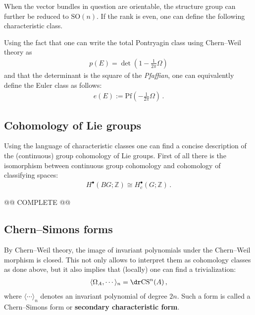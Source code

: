     When the vector bundles in question are orientable, the structure group can further be reduced to $\mathrm{SO}(n)$. If the rank is even, one can define the following characteristic class.
    \begin{property}
        Using the fact that one can write the total Pontryagin class using Chern--Weil theory as
        \begin{gather}
            p(E) = \det\left(1-\frac{1}{2\pi}\Omega\right)
        \end{gather}
        and that the determinant is the square of the \textit{Pfaffian}, one can equivalently define the Euler class as follows:
        \begin{gather}
            e(E) := \mathrm{Pf}\left(-\frac{1}{2\pi}\Omega\right)\,.
        \end{gather}
    \end{property}

\subsection{Cohomology of Lie groups}

    Using the language of characteristic classes one can find a concise description of the (continuous) group cohomology of Lie groups. First of all there is the isomorphism between continuous group cohomology and cohomology of classifying spaces:
    \begin{gather}
        H^\bullet(BG;\mathbb{Z})\cong H^\bullet_c(G;\mathbb{Z})\,.
    \end{gather}

    @@ COMPLETE @@

\subsection{Chern--Simons forms}\label{section:chern_simons}

    By Chern--Weil theory, the image of invariant polynomials under the Chern--Weil morphism is closed. This not only allows to interpret them as cohomology classes as done above, but it also implies that (locally) one can find a trivialization:
    \begin{gather}
        \langle\Omega_A,\cdots\rangle_n = \dr\mathrm{CS}^n(A)\,,
    \end{gather}
    where $\langle\cdots\rangle_n$ denotes an invariant polynomial of degree $2n$. Such a form is called a Chern--Simons form or \textbf{secondary characteristic form}.

